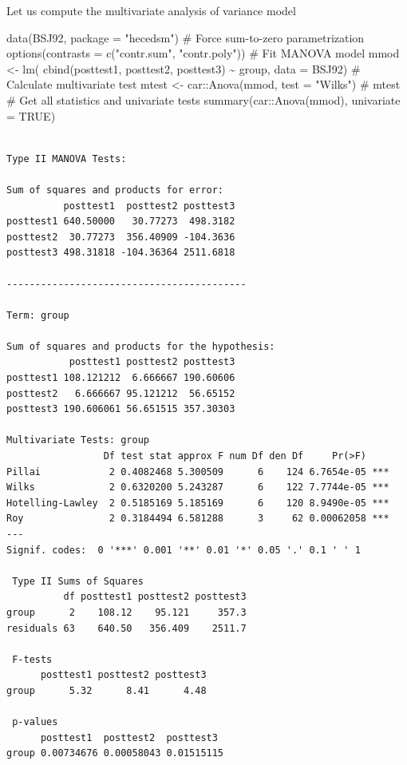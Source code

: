 \documentclass[
  11pt,
  letterpaper,
]{scrbook}
\newenvironment{Shaded}{\begin{snugshade}}{\end{snugshade}}
\newcommand{\AttributeTok}[1]{\textcolor[rgb]{0.40,0.45,0.13}{#1}}
\newcommand{\CommentTok}[1]{\textcolor[rgb]{0.37,0.37,0.37}{#1}}
\newcommand{\ConstantTok}[1]{\textcolor[rgb]{0.56,0.35,0.01}{#1}}
\newcommand{\FunctionTok}[1]{\textcolor[rgb]{0.28,0.35,0.67}{#1}}
\newcommand{\NormalTok}[1]{\textcolor[rgb]{0.00,0.23,0.31}{#1}}
\newcommand{\OtherTok}[1]{\textcolor[rgb]{0.00,0.23,0.31}{#1}}
\newcommand{\SpecialCharTok}[1]{\textcolor[rgb]{0.37,0.37,0.37}{#1}}
\newcommand{\StringTok}[1]{\textcolor[rgb]{0.13,0.47,0.30}{#1}}
\theoremstyle{definition}
\theoremstyle{remark}
\begin{document}
Let us compute the multivariate analysis of variance model

\begin{Shaded}
\begin{Highlighting}[]
\FunctionTok{data}\NormalTok{(BSJ92, }\AttributeTok{package =} \StringTok{"hecedsm"}\NormalTok{)}
\CommentTok{\# Force sum{-}to{-}zero parametrization}
\FunctionTok{options}\NormalTok{(}\AttributeTok{contrasts =} \FunctionTok{c}\NormalTok{(}\StringTok{"contr.sum"}\NormalTok{, }\StringTok{"contr.poly"}\NormalTok{))}
\CommentTok{\# Fit MANOVA model}
\NormalTok{mmod }\OtherTok{\textless{}{-}} \FunctionTok{lm}\NormalTok{(}
  \FunctionTok{cbind}\NormalTok{(posttest1, posttest2, posttest3) }\SpecialCharTok{\textasciitilde{}}\NormalTok{ group,}
   \AttributeTok{data =}\NormalTok{ BSJ92)}
\CommentTok{\# Calculate multivariate test}
\NormalTok{mtest }\OtherTok{\textless{}{-}}\NormalTok{ car}\SpecialCharTok{::}\FunctionTok{Anova}\NormalTok{(mmod, }\AttributeTok{test =} \StringTok{"Wilks"}\NormalTok{)}
\CommentTok{\# mtest}
\CommentTok{\# Get all statistics and univariate tests}
\FunctionTok{summary}\NormalTok{(car}\SpecialCharTok{::}\FunctionTok{Anova}\NormalTok{(mmod), }\AttributeTok{univariate =} \ConstantTok{TRUE}\NormalTok{)}
\end{Highlighting}
\end{Shaded}

\begin{verbatim}

Type II MANOVA Tests:

Sum of squares and products for error:
          posttest1  posttest2 posttest3
posttest1 640.50000   30.77273  498.3182
posttest2  30.77273  356.40909 -104.3636
posttest3 498.31818 -104.36364 2511.6818

------------------------------------------
 
Term: group 

Sum of squares and products for the hypothesis:
           posttest1 posttest2 posttest3
posttest1 108.121212  6.666667 190.60606
posttest2   6.666667 95.121212  56.65152
posttest3 190.606061 56.651515 357.30303

Multivariate Tests: group
                 Df test stat approx F num Df den Df     Pr(>F)    
Pillai            2 0.4082468 5.300509      6    124 6.7654e-05 ***
Wilks             2 0.6320200 5.243287      6    122 7.7744e-05 ***
Hotelling-Lawley  2 0.5185169 5.185169      6    120 8.9490e-05 ***
Roy               2 0.3184494 6.581288      3     62 0.00062058 ***
---
Signif. codes:  0 '***' 0.001 '**' 0.01 '*' 0.05 '.' 0.1 ' ' 1

 Type II Sums of Squares
          df posttest1 posttest2 posttest3
group      2    108.12    95.121     357.3
residuals 63    640.50   356.409    2511.7

 F-tests
      posttest1 posttest2 posttest3
group      5.32      8.41      4.48

 p-values
      posttest1  posttest2  posttest3 
group 0.00734676 0.00058043 0.01515115
\end{verbatim}
\end{document}
